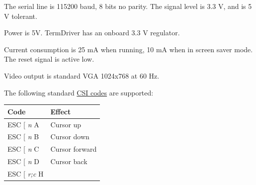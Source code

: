 \documentclass{article}
\begin{document}
The serial line is 115200 baud, 8 bits no parity. The signal level is
3.3 V, and is 5 V tolerant.

Power is 5V. TermDriver has an onboard 3.3 V regulator.

Current consumption is 25 mA when running, 10 mA when in screen saver
mode. The reset signal is active low.

Video output is standard VGA 1024x768 at 60 Hz.

The following standard
\href{https://en.wikipedia.org/wiki/ANSI_escape_code\#CSI_sequences}{CSI
codes} are supported:

\begin{longtable}[]{@{}ll@{}}
\toprule
\begin{minipage}[b]{0.34\columnwidth}\raggedright
Code\strut
\end{minipage} & \begin{minipage}[b]{0.60\columnwidth}\raggedright
Effect\strut
\end{minipage}\tabularnewline
\midrule
\endhead
\begin{minipage}[t]{0.34\columnwidth}\raggedright
ESC {[} \emph{n} A\strut
\end{minipage} & \begin{minipage}[t]{0.60\columnwidth}\raggedright
Cursor up\strut
\end{minipage}\tabularnewline
\begin{minipage}[t]{0.34\columnwidth}\raggedright
ESC {[} \emph{n} B\strut
\end{minipage} & \begin{minipage}[t]{0.60\columnwidth}\raggedright
Cursor down\strut
\end{minipage}\tabularnewline
\begin{minipage}[t]{0.34\columnwidth}\raggedright
ESC {[} \emph{n} C\strut
\end{minipage} & \begin{minipage}[t]{0.60\columnwidth}\raggedright
Cursor forward\strut
\end{minipage}\tabularnewline
\begin{minipage}[t]{0.34\columnwidth}\raggedright
ESC {[} \emph{n} D\strut
\end{minipage} & \begin{minipage}[t]{0.60\columnwidth}\raggedright
Cursor back\strut
\end{minipage}\tabularnewline
\begin{minipage}[t]{0.34\columnwidth}\raggedright
ESC {[} \emph{r;c} H\strut
\end{minipage} & \begin{minipage}[t]{0.60\columnwidth}\raggedright

\end{minipage}
\end{longtable}
\end{document}
